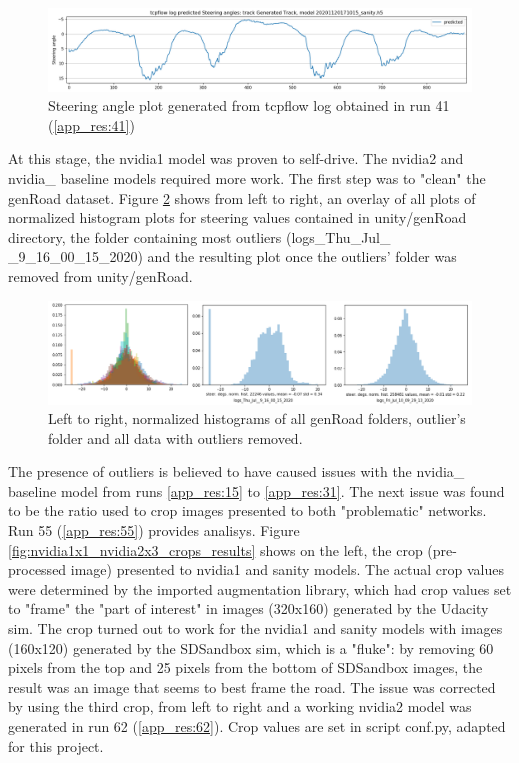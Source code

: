 \begin{figure}[ht]
 \centering 
 \includegraphics[width=\textwidth]{Figures/sa_GeneratedTrack_20201120171015_sanity.h5.png}
 \caption{Steering angle plot generated from tcpflow log obtained in run 41 (\ref{app_res:41})}
 \label{fig:sa_GeneratedTrack_20201120171015_sanity} 
\end{figure}

At this stage, the nvidia1 model was proven to self-drive. The nvidia2 and nvidia\_ baseline models required more work. The first step was to "clean" the genRoad dataset. %
Figure \ref{fig:SkewCleanup} shows from left to right, an overlay of all plots of normalized histogram plots for steering values contained in unity/genRoad directory, the folder containing most outliers (logs\_Thu\_Jul\_ \_9\_16\_00\_15\_2020) and the resulting plot once the outliers' folder was removed from unity/genRoad. 
\begin{figure}[h!]
\centering
\includegraphics[width=\textwidth]{Figures/SkewCleanup.png}
\caption{Left to right, normalized histograms of all genRoad folders, outlier's folder and all data with outliers removed.}
\label{fig:SkewCleanup}
\end{figure}
The presence of outliers is believed to have caused issues with the nvidia\_ baseline model from runs \ref{app_res:15} to \ref{app_res:31}. The next issue was found to be the ratio used to crop images presented to both "problematic" networks. Run 55 (\ref{app_res:55}) provides analisys. Figure \ref{fig:nvidia1x1_nvidia2x3_crops_results} shows on the left, the crop (pre-processed image) presented to nvidia1 and sanity models. The actual crop values were determined by the imported augmentation library, which had crop values set to "frame" the "part of interest" in images (320x160) generated by the Udacity sim. The crop turned out to work for the nvidia1 and sanity models with images (160x120) generated by the SDSandbox sim, which is a "fluke": by removing 60 pixels from the top and 25 pixels from the bottom of SDSandbox images, the result was an image that seems to best frame the road. The issue was corrected by using the third crop, from left to right and a working nvidia2 model was generated in run 62 (\ref{app_res:62}). Crop values are set in script conf.py, adapted for this project.

